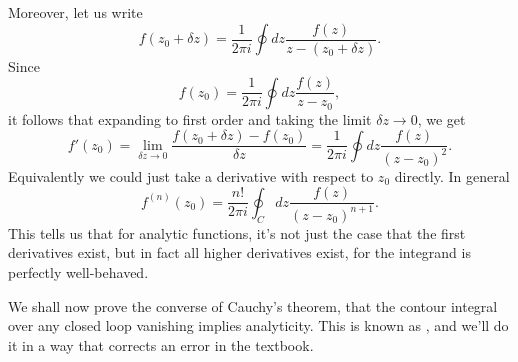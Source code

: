 Moreover, let us write
\begin{equation}
    f(z_0+\delta z) = \frac{1}{2\pi i} \oint dz \frac{f(z)}{z-(z_0+\delta z)}.
\end{equation}
Since
\begin{equation}
    f(z_0) = \frac{1}{2\pi i} \oint dz \frac{f(z)}{z-z_0},
\end{equation}
it follows that expanding to first order and taking the limit $\delta z \to 0$, we get
\begin{equation}
    f'(z_0) = \lim_{\delta z \to 0} \frac{f(z_0+\delta z) - f(z_0)}{\delta z} = \frac{1}{2\pi i} \oint dz \frac{f(z)}{(z-z_0)^2}.
\end{equation}
Equivalently we could just take a derivative with respect to $z_0$ directly. In general
\begin{equation}
    f^{(n)}(z_0) = \frac{n!}{2\pi i} \oint_C dz \frac{f(z)}{(z-z_0)^{n+1}}.
\end{equation}
This tells us that for analytic functions, it's not just the case that the first derivatives exist, but in fact all higher derivatives exist, for the integrand is perfectly well-behaved.

We shall now prove the converse of Cauchy's theorem, that the contour integral over any closed loop vanishing implies analyticity. This is known as , and we'll do it in a way that corrects an error in the textbook.

